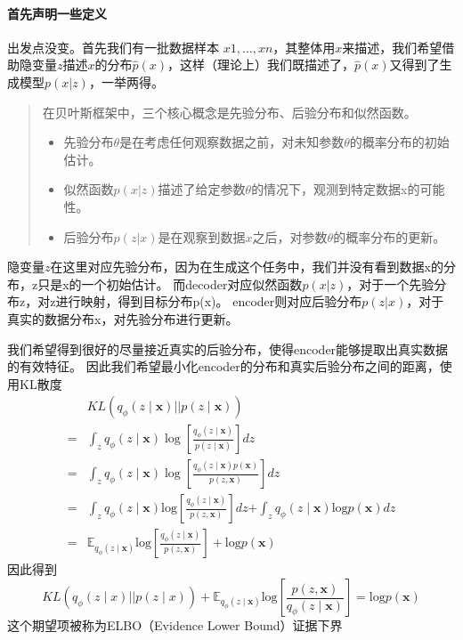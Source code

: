 \paragraph{首先声明一些定义}
出发点没变。首先我们有一批数据样本 ${x1,…,xn}$，其整体用$x$来描述，我们希望借助隐变量$z$描述$x$的分布$\hat{p}(x)$，这样（理论上）我们既描述了，$\hat{p}(x)$又得到了生成模型$p(x|z)$，一举两得。
\begin{quotation}
    在贝叶斯框架中，三个核心概念是先验分布、后验分布和似然函数。
    \begin{itemize}
        \item 先验分布$\theta$是在考虑任何观察数据之前，对未知参数$\theta$的概率分布的初始估计。
        \item 似然函数$p(x|z)$描述了给定参数$\theta$的情况下，观测到特定数据x的可能性。
        \item 后验分布$p(z|x)$是在观察到数据$x$之后，对参数$\theta$的概率分布的更新。
    \end{itemize}
\end{quotation}
隐变量$z$在这里对应先验分布，因为在生成这个任务中，我们并没有看到数据x的分布，z只是x的一个初始估计。
而decoder对应似然函数$p(x|z)$，对于一个先验分布z，对z进行映射，得到目标分布p(x)。
encoder则对应后验分布$p(z|x)$，对于真实的数据分布x，对先验分布进行更新。

我们希望得到很好的尽量接近真实的后验分布，使得encoder能够提取出真实数据的有效特征。
因此我们希望最小化encoder的分布和真实后验分布之间的距离，使用KL散度
\begin{align}
    & KL\left(q_\phi\left(z\mid\boldsymbol{x}\right)||p\left(z\mid\boldsymbol{x}\right)\right) \\
    =&\int_zq_\phi\left(z\mid\boldsymbol{x}\right)\log\left[\frac{q_\phi\left(z\mid\boldsymbol{x}\right)}{p\left(z\mid\boldsymbol{x}\right)}\right]dz \\
    =&\int_zq_\phi\left(z\mid\boldsymbol{x}\right)\log\left[\frac{q_\phi\left(z\mid\boldsymbol{x}\right)p(\boldsymbol{x})}{p\left(z,\boldsymbol{x}\right)}\right]dz \\
    =&\int_zq_\phi\left(z\mid\boldsymbol{x}\right)\mathrm{log}\left[\frac{q_\phi\left(z\mid\boldsymbol{x}\right)}{p\left(z,\boldsymbol{x}\right)}\right]dz\boldsymbol{+}\int_zq_\phi\left(z\mid\boldsymbol{x}\right)\mathrm{log}p\left(\boldsymbol{x}\right)dz \\
    =&\mathbb{E}_{q_\phi(z\mid\boldsymbol{x})}\mathrm{log}{\left[\frac{q_\phi\left(z\mid\boldsymbol{x}\right)}{p\left(z,\boldsymbol{x}\right)}\right]}+\mathrm{log}p\left(\boldsymbol{x}\right)
\end{align}
因此得到
\begin{equation}
    KL\left(q_\phi\left(z\mid x\right)||p\left(z\mid x\right)\right)+\mathbb{E}_{q_\phi\left(z\mid\boldsymbol{x}\right)}\mathrm{log}\left[\frac{p\left(z,\boldsymbol{x}\right)}{q_\phi\left(z\mid\boldsymbol{x}\right)}\right]=\mathrm{log}p\left(\boldsymbol{x}\right)
\end{equation}
这个期望项被称为ELBO（Evidence Lower Bound）证据下界

